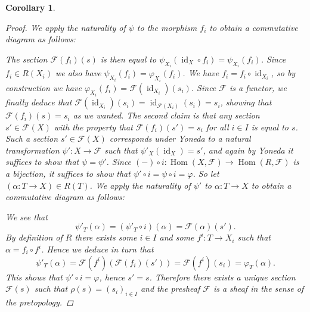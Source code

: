 \documentclass[12pt,reqno,a4paper]{amsart}
\theoremstyle{plain}
\newtheorem{cor}[thm]{Corollary}
\theoremstyle{definition}
\theoremstyle{remark}
\begin{document}
\begin{cor}
\begin{proof}
    We apply the naturality of $\psi$ to the morphism $f_{i}$ to obtain a commutative diagram as follows:
    \begin{center}
    \end{center}
    The section $\mathscr{F}(f_{i})(s)$ is then equal to $\psi_{X_{i}}(\operatorname{id}_{X} \circ f_{i}) = \psi_{X_{i}}(f_{i})$.
    Since $f_{i} \in R(X_{i})$ we also have $\psi_{X_{i}}(f_{i}) = \varphi_{X_{i}}(f_{i})$.
    We have $f_{i} = f_{i} \circ \operatorname{id}_{X_{i}}$, so by construction we have $\varphi_{X_{i}}(f_{i}) = \mathscr{F}(\operatorname{id}_{X_{i}})(s_{i})$.
    Since $\mathscr{F}$ is a functor, we finally deduce that $\mathscr{F}(\operatorname{id}_{X_{i}})(s_{i}) = \operatorname{id}_{\mathscr{F}(X_{i})}(s_{i}) = s_{i}$, showing that $\mathscr{F}(f_{i})(s) = s_{i}$ as we wanted.
    The second claim is that any section $s' \in \mathscr{F}(X)$ with the property that $\mathscr{F}(f_{i})(s') = s_{i}$ for all $i \in I$ is equal to $s$.
    Such a section $s' \in \mathscr{F}(X)$ corresponds under Yoneda to a natural transformation $\psi' \colon X \to \mathscr{F}$ such that $\psi'_{X}(\operatorname{id}_{X}) = s'$, and again by Yoneda it suffices to show that $\psi = \psi'$.
    Since $(-) \circ i \colon \operatorname{Hom}(X,\mathscr{F}) \to \operatorname{Hom}(R,\mathscr{F})$ is a bijection, it suffices to show that $\psi' \circ i = \psi \circ i = \varphi$.
    So let $(\alpha \colon T \to X) \in R(T)$.
    We apply the naturality of $\psi'$ to $\alpha \colon T \to X$ to obtain a commutative diagram as follows:
    \begin{center}
    \end{center}
    We see that
    \[ \psi'_{T}(\alpha) = (\psi'_{T} \circ i)(\alpha) = \mathscr{F}(\alpha)(s'). \]
    By definition of $R$ there exists some $i \in I$ and some $f^{i} \colon T \to X_{i}$ such that $\alpha = f_{i} \circ f^{i}$.
    Hence we deduce in turn that
    \[ \psi'_{T}(\alpha) = \mathscr{F}(f^{i})(\mathscr{F}(f_{i})(s')) = \mathscr{F}(f^{i})(s_{i}) = \varphi_{T}(\alpha). \]
    This shows that $\psi' \circ i = \varphi$, hence $s' = s$.
    Therefore there exists a unique section $\mathscr{F}(s)$ such that $\rho(s) = (s_{i})_{i \in I}$ and the presheaf $\mathscr{F}$ is a sheaf in the sense of the pretopology.


\end{proof}
\end{cor}
\end{document}
